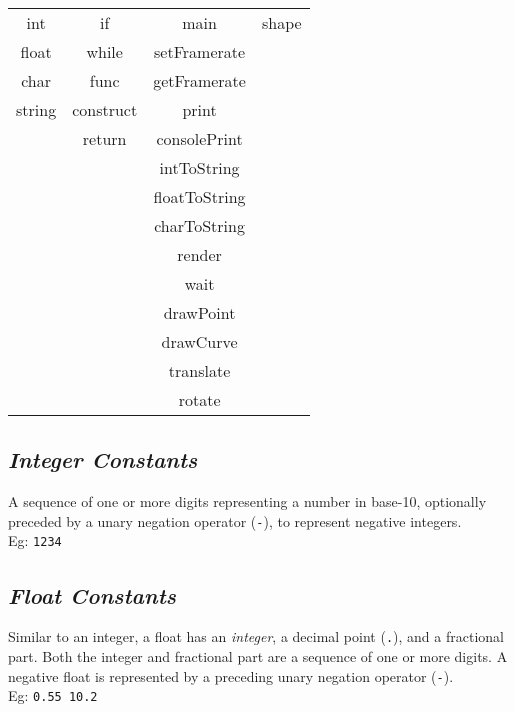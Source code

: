         \begin{center}
            \begin{tabular}{ |c|c|c|c| } 
            \hline
                int     & if            & main          & shape   \\ 
                float   & while         & setFramerate  & \\ 
                char    & func          & getFramerate  & \\
                string  & construct     & print         & \\
                        & return        & consolePrint  & \\
                        &               & intToString   & \\
                        &               & floatToString & \\
                        &               & charToString  & \\
                        &               & render        & \\
                        &               & wait          & \\
                        &               & drawPoint     & \\
                        &               & drawCurve     & \\
                        &               & translate     & \\
                        &               & rotate        & \\

            \hline
            \end{tabular}
        \end{center}

    \subsection{\textit{Integer Constants}}
    A sequence of one or more digits representing a number in base-10, optionally preceded by a unary negation operator (\texttt{-}), to represent negative integers.\\
    Eg: \texttt{1234}

    \subsection{\textit{Float Constants}}
    Similar to an integer, a float has an \textit{integer}, a decimal point (\texttt{.}), and a fractional part. Both the integer and fractional part are a sequence of one or more digits. A negative float is represented by a preceding unary negation operator (\texttt{-}).\\
    Eg: \texttt{0.55  10.2}

